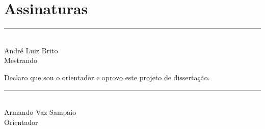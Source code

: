 \documentclass[12pt]{article}
\numberwithin{equation}{section}
\theoremstyle{definition}
\begin{document}
\newpage

\onehalfspacing

\printbibliography[heading=bibintoc]

\newpage

\appendix

\section*{Assinaturas}

\vspace{5cm}

{\singlespacing
	{\centering
		\noindent\rule{4in}{0.7pt}\\
		\noindent André Luiz Brito\\
		Mestrando\\
	}
}

\vspace{4cm}

Declaro que sou o orientador e aprovo este projeto de dissertação.

\vspace{4cm}

{\singlespacing
	{\centering
		\noindent\rule{4in}{0.7pt}\\
		Armando Vaz Sampaio\\
		Orientador\\
	}
}
\end{document}
